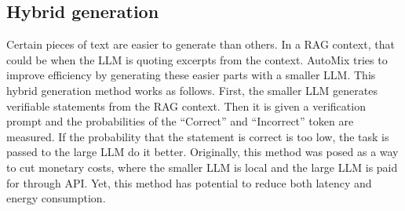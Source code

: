 \subsection{Hybrid generation}
Certain pieces of text are easier to generate than others. In a RAG context, that could be when the LLM is quoting excerpts from the context. AutoMix tries to improve efficiency by generating these easier parts with a smaller LLM. This hybrid generation method works as follows. First, the smaller LLM generates verifiable statements from the RAG context. Then it is given a verification prompt and the probabilities of the ``Correct'' and ``Incorrect'' token are measured. If the probability that the statement is correct is too low, the task is passed to the large LLM do it better. Originally, this method was posed as a way to cut monetary costs, where the smaller LLM is local and the large LLM is paid for through API. Yet, this method has potential to reduce both latency and energy consumption.

